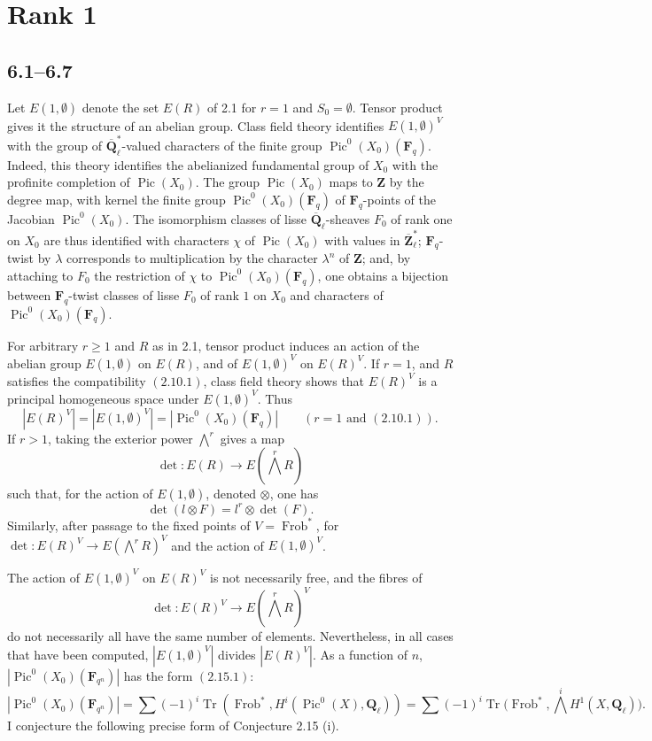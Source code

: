 \documentclass[11pt]{article}
\newcommand{\Qbar}{\overline{\mathbf Q}}
\newcommand{\Ql}{\mathbf Q_\ell}
\newcommand{\Fq}{\mathbf F_q}
\newcommand{\Z}{\mathbf Z}
\newcommand{\Frob}{\operatorname{Frob}}
\newcommand{\Tr}{\operatorname{Tr}}
\newcommand{\Pic}{\operatorname{Pic}}
\begin{document}
\section{Rank 1}

\subsection{6.1--6.7}
Let \(E(1,\emptyset)\) denote the set \(E(R)\) of 2.1 for \(r=1\) and \(S_0=\emptyset\). Tensor product gives it the structure of an abelian group. Class field theory identifies \(E(1,\emptyset)^V\) with the group of \(\Qbar_\ell^*\)-valued characters of the finite group \(\Pic^0(X_0)(\Fq)\). Indeed, this theory identifies the abelianized fundamental group of \(X_0\) with the profinite completion of \(\Pic(X_0)\). The group \(\Pic(X_0)\) maps to \(\Z\) by the degree map, with kernel the finite group \(\Pic^0(X_0)(\Fq)\) of \(\Fq\)-points of the Jacobian \(\Pic^0(X_0)\). The isomorphism classes of lisse \(\Qbar_\ell\)-sheaves \(F_0\) of rank one on \(X_0\) are thus identified with characters \(\chi\) of \(\Pic(X_0)\) with values in \(\overline{\mathbf Z}_\ell^*\); \(\Fq\)-twist by \(\lambda\) corresponds to multiplication by the character \(\lambda^n\) of \(\Z\); and, by attaching to \(F_0\) the restriction of \(\chi\) to \(\Pic^0(X_0)(\Fq)\), one obtains a bijection between \(\Fq\)-twist classes of lisse \(F_0\) of rank \(1\) on \(X_0\) and characters of \(\Pic^0(X_0)(\Fq)\).

For arbitrary \(r\ge 1\) and \(R\) as in 2.1, tensor product induces an action of the abelian group \(E(1,\emptyset)\) on \(E(R)\), and of \(E(1,\emptyset)^V\) on \(E(R)^V\). If \(r=1\), and \(R\) satisfies the compatibility \((2.10.1)\), class field theory shows that \(E(R)^V\) is a principal homogeneous space under \(E(1,\emptyset)^V\). Thus
\begin{equation}\tag{6.2.1}
|E(R)^V|=|E(1,\emptyset)^V|=|\Pic^0(X_0)(\Fq)|\qquad (r=1\text{ and }(2.10.1)).
\end{equation}
If \(r>1\), taking the exterior power \(\bigwedge^r\) gives a map
\[
\det:E(R)\to E(\bigwedge^r R)
\]
such that, for the action of \(E(1,\emptyset)\), denoted \(\otimes\), one has
\[
\det(l\otimes F)=l^r\otimes\det(F).
\]
Similarly, after passage to the fixed points of \(V=\Frob^*\), for \(\det:E(R)^V\to E(\bigwedge^r R)^V\) and the action of \(E(1,\emptyset)^V\).

The action of \(E(1,\emptyset)^V\) on \(E(R)^V\) is not necessarily free, and the fibres of
\[
\det:E(R)^V\to E(\bigwedge^r R)^V
\]
do not necessarily all have the same number of elements. Nevertheless, in all cases that have been computed, \(|E(1,\emptyset)^V|\) divides \(|E(R)^V|\). As a function of \(n\), \(|\Pic^0(X_0)(\mathbf F_{q^n})|\) has the form \((2.15.1)\):
\[
|\Pic^0(X_0)(\mathbf F_{q^n})|=\sum(-1)^i\Tr(\Frob^*,H^i(\Pic^0(X),\Ql))
=\sum(-1)^i\Tr\bigl(\Frob^*,\bigwedge^iH^1(X,\Ql)\bigr).
\]
I conjecture the following precise form of Conjecture 2.15 (i).
\end{document}
